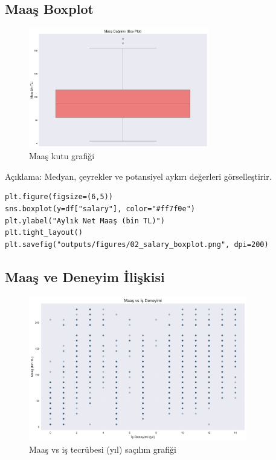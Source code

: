 \documentclass[12pt,a4paper]{article}
\begin{document}
\subsection{Maaş Boxplot}
\begin{figure}[H]
    \centering
    \includegraphics[width=0.7\textwidth]{02_salary_boxplot.png}
    \caption{Maaş kutu grafiği}
\end{figure}

\noindent Açıklama: Medyan, çeyrekler ve potansiyel aykırı değerleri görselleştirir.

\begin{lstlisting}[style=python, caption={Boxplot üretim kodu}]
plt.figure(figsize=(6,5))
sns.boxplot(y=df["salary"], color="#ff7f0e")
plt.ylabel("Aylık Net Maaş (bin TL)")
plt.tight_layout()
plt.savefig("outputs/figures/02_salary_boxplot.png", dpi=200)
\end{lstlisting}

\subsection{Maaş ve Deneyim İlişkisi}
\begin{figure}[H]
    \centering
    \includegraphics[width=0.85\textwidth]{11_salary_vs_experience_scatter.png}
    \caption{Maaş vs iş tecrübesi (yıl) saçılım grafiği}
\end{figure}
\end{document}
